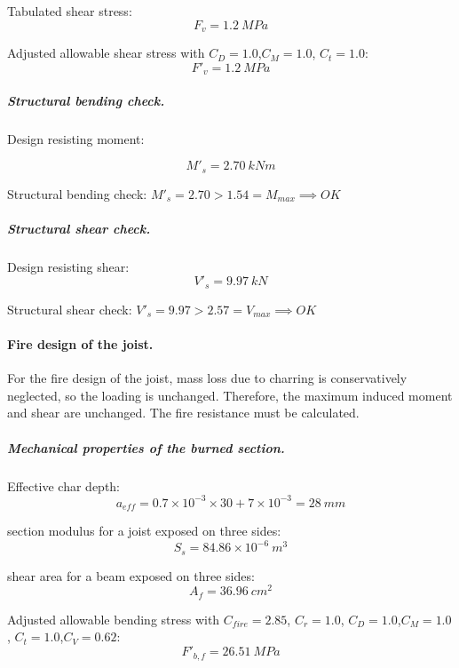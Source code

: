 \noindent Tabulated shear stress:
\begin{equation}
  F_v= 1.2\ MPa
\end{equation}

\noindent Adjusted allowable shear stress with $C_D= 1.0$,$C_M= 1.0$, $C_t= 1.0$:
\begin{equation}
  F'_v= 1.2\ MPa
\end{equation}

\subparagraph{Structural bending check.}

\noindent Design resisting moment:

\begin{equation}
  M'_s= 2.70\ kN m
\end{equation}

\noindent Structural bending check: $M'_s = 2.70 > 1.54 = M_{max} \implies OK$

\subparagraph{Structural shear check.}

\noindent Design resisting shear:
\begin{equation}
  V'_s= 9.97\ kN
\end{equation}

\noindent Structural shear check: $V'_s = 9.97 > 2.57 = V_{max} \implies OK$

\paragraph{Fire design of the joist.}
For the fire design of the joist, mass loss due to charring is conservatively neglected, so the loading is unchanged. Therefore, the maximum induced moment and shear are unchanged. The fire resistance must be calculated.

\subparagraph{Mechanical properties of the burned section.}

\noindent Effective char depth:
\begin{equation}
  a_{eff}= 0.7 \times 10^{-3} \times 30 + 7 \times 10^{-3}= 28\ mm
\end{equation}

\noindent section modulus for a joist exposed on three sides:
\begin{equation}
  S_s= 84.86 \times 10^{-6}\ m^3
\end{equation}

\noindent shear area for a beam exposed on three sides:
\begin{equation}
  A_f= 36.96\ cm^2
\end{equation}

\noindent Adjusted allowable bending stress with $C_{fire}= 2.85$, $C_r= 1.0$, $C_D= 1.0$,$C_M= 1.0$, $C_t= 1.0$,$C_V= 0.62$:
\begin{equation}
  F'_{b,f}= 26.51\ MPa
\end{equation}

